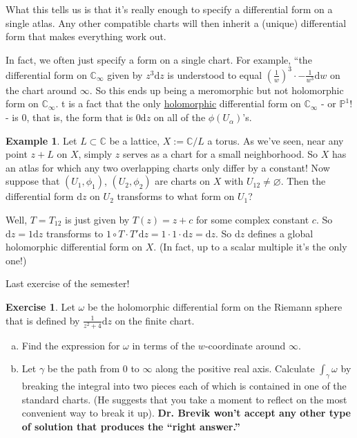 \documentclass[12pt]{article}
\newcommand{\cx}{\mathbb{C}}
\newcommand{\p}{\mathbb{P}}
\newcommand{\paren}[1]{\left( #1 \right)}
\theoremstyle{definition}
\newtheorem{example}[theorem]{Example}
\newtheorem{exercise}{Exercise}
\theoremstyle{remark}
\begin{document}
What this tells us is that it's really enough to specify a differential form on a single atlas. Any other compatible charts will then inherit a (unique) differential form that makes everything work out.

In fact, we often just specify a form on a single chart. For example, ``the differential form on $\cx_{\infty}$ given by $z^3 \mathrm{d}z$ is understood to equal $\paren{ \frac{1}{w} }^3 \cdot -\frac{1}{w^3} \mathrm{d}w$ on the chart around $\infty$. So this ends up being a meromorphic but not holomorphic form on $\cx_{\infty}$. t is a fact that the only \underline{holomorphic} differential form on $\cx_{\infty}$ - or $\p^1$! - is 0, that is, the form that is $0 \mathrm{d}z$ on all of the $\phi \paren{ U_{\alpha} }$'s.
\begin{example}
    Let $L \subset \cx$ be a lattice, $X := \cx / L$ a torus. As we've seen, near any point $z + L$ on $X$, simply $z$ serves as a chart for a small neighborhood. So $X$ has an atlas for which any two overlapping charts only differ by a constant! Now suppose that $\paren{ U_1 , \phi_1 }$, $\paren{ U_2 , \phi_2 }$ are charts on $X$ with $U_{12} \neq \varnothing$. Then the differential form $\mathrm{d}z$ on $U_2$ transforms to what form on $U_1$?
    
    Well, $T = T_{12}$ is just given by $T(z) = z + c$ for some complex constant $c$. So $\mathrm{d}z = 1 \mathrm{d}z$ transforms to $1 \circ T \cdot T' \mathrm{d}z = 1 \cdot 1 \cdot \mathrm{d}z = \mathrm{d}z$. So $\mathrm{d}z$ defines a global holomorphic differential form on $X$. (In fact, up to a scalar multiple it's the only one!)
\end{example}
Last exercise of the semester!
\begin{exercise}
    Let $\omega$ be the holomorphic differential form on the Riemann sphere that is defined by $\frac{1}{z^2 + 4}\mathrm{d}z$ on the finite chart.
    \begin{enumerate}[(a)]
        \item Find the expression for $\omega$ in terms of the $w$-coordinate around $\infty$.
        \item Let $\gamma$ be the path from $0$ to $\infty$ along the positive real axis. Calculate $\int_{\gamma} \omega$ by breaking the integral into two pieces each of which is contained in one of the standard charts. (He suggests that you take a moment to reflect on the most convenient way to break it up). \textbf{Dr. Brevik won't accept any other type of solution that produces the ``right answer.''}
    \end{enumerate}
\end{exercise}
\end{document}
